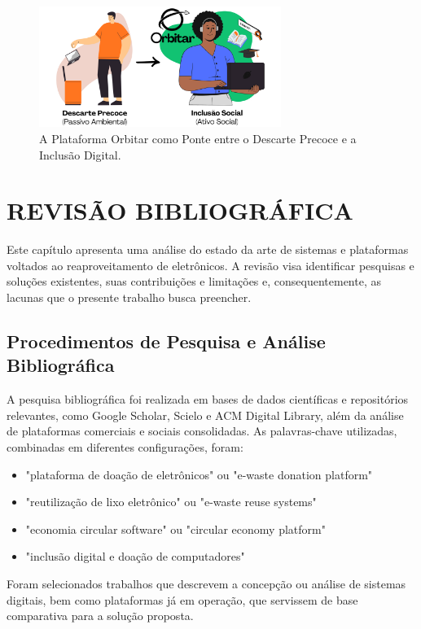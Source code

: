 \documentclass[
	12pt,				%
	openright,			%
	oneside,			%
	a4paper,			%
	english,			%
	brazil				%
	]{abntex2}
\theoremstyle{definition}
\begin{document}
\begin{figure}[H] %
    \centering
    \includegraphics[width=0.7\textwidth]{imagens/compara.png}
    \caption{A Plataforma Orbitar como Ponte entre o Descarte Precoce e a Inclusão Digital.}
    \label{fig:ponte-orbitar}
\end{figure}


\chapter[Revisão Bibliográfica]{REVISÃO BIBLIOGRÁFICA}
Este capítulo apresenta uma análise do estado da arte de sistemas e plataformas voltados ao reaproveitamento de eletrônicos. A revisão visa identificar pesquisas e soluções existentes, suas contribuições e limitações e, consequentemente, as lacunas que o presente trabalho busca preencher.

\section{Procedimentos de Pesquisa e Análise Bibliográfica}

A pesquisa bibliográfica foi realizada em bases de dados científicas e repositórios relevantes, como Google Scholar, Scielo e ACM Digital Library, além da análise de plataformas comerciais e sociais consolidadas. As palavras-chave utilizadas, combinadas em diferentes configurações, foram:
\begin{itemize}
    \item "plataforma de doação de eletrônicos" ou "e-waste donation platform"
    \item "reutilização de lixo eletrônico" ou "e-waste reuse systems"
    \item "economia circular software" ou "circular economy platform"
    \item "inclusão digital e doação de computadores"
\end{itemize}
Foram selecionados trabalhos que descrevem a concepção ou análise de sistemas digitais, bem como plataformas já em operação, que servissem de base comparativa para a solução proposta.
\end{document}
